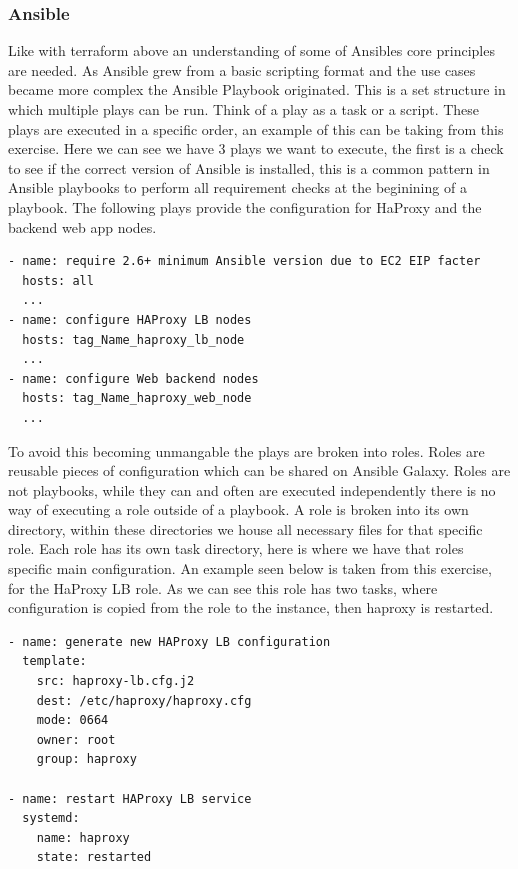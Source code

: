 \subsubsection{Ansible}
Like with terraform above an understanding of some of Ansibles core principles are needed. As Ansible grew from a basic scripting format and the use cases became more complex the Ansible Playbook originated. This is a set structure in which multiple plays can be run. Think of a play as a task or a script. These plays are executed in a specific order, an example of this can be taking from this exercise. Here we can see we have 3 plays we want to execute, the first is a check to see if the correct version of Ansible is installed, this is a common pattern in Ansible playbooks to perform all requirement checks at the beginining of a playbook. The following plays provide the configuration for HaProxy and the backend web app nodes. 
\begin{lstlisting}[language=bash]
- name: require 2.6+ minimum Ansible version due to EC2 EIP facter
  hosts: all
  ...
- name: configure HAProxy LB nodes
  hosts: tag_Name_haproxy_lb_node
  ...
- name: configure Web backend nodes
  hosts: tag_Name_haproxy_web_node
  ...
\end{lstlisting}
To avoid this becoming unmangable the plays are broken into roles. Roles are reusable pieces of configuration which can be shared on Ansible Galaxy. Roles are not playbooks, while they can and often are executed independently there is no way of executing a role outside of a playbook. A role is broken into its own directory, within these directories we house all necessary files for that specific role. Each role has its own task directory, here is where we have that roles specific main configuration. An example seen below is taken from this exercise, for the HaProxy LB role. As we can see this role has two tasks, where configuration is copied from the role to the instance, then haproxy is restarted.
\begin{lstlisting}[language=bash]
- name: generate new HAProxy LB configuration
  template:
    src: haproxy-lb.cfg.j2
    dest: /etc/haproxy/haproxy.cfg
    mode: 0664
    owner: root
    group: haproxy

- name: restart HAProxy LB service
  systemd:
    name: haproxy
    state: restarted
\end{lstlisting}

